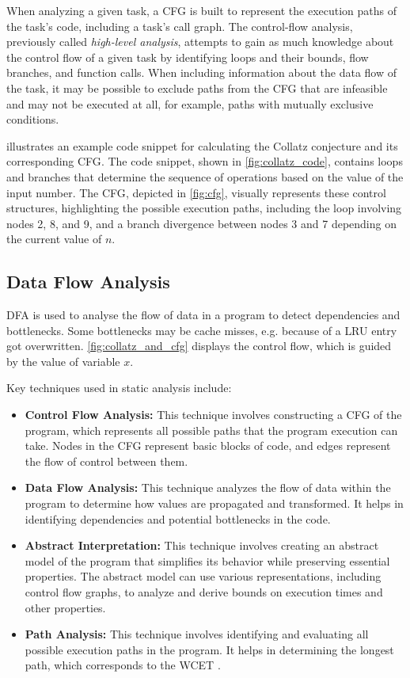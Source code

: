 When analyzing a given task, a \ac{CFG} is built to represent the execution paths of the task's code, including a task's call graph. The control-flow analysis, previously called \textit{high-level analysis}, attempts to gain as much knowledge about the control flow of a given task by identifying loops and their bounds, flow branches, and function calls. When including information about the data flow of the task, it may be possible to exclude paths from the \ac{CFG} that are infeasible and may not be executed at all, for example, paths with mutually exclusive conditions. 

 illustrates an example code snippet for calculating the Collatz conjecture and its corresponding \ac{CFG}. The code snippet, shown in \cref{fig:collatz_code}, contains loops and branches that determine the sequence of operations based on the value of the input number. The \ac{CFG}, depicted in \cref{fig:cfg}, visually represents these control structures, highlighting the possible execution paths, including the loop involving nodes 2, 8, and 9, and a branch divergence between nodes 3 and 7 depending on the current value of $n$.


\subsection{Data Flow Analysis}\label{sec:dfa}
\ac{DFA} is used to analyse the flow of data in a program to detect dependencies and bottlenecks.
Some bottlenecks may be cache misses, e.g. because of a \ac{LRU} entry got overwritten.
\ref{fig:collatz_and_cfg} displays the control flow, which is guided by the value of variable $x$.

Key techniques used in static analysis include:
\begin{itemize}
	\item \textbf{Control Flow Analysis:} This technique involves constructing a \ac{CFG} of the program, which represents all possible paths that the program execution can take. Nodes in the CFG represent basic blocks of code, and edges represent the flow of control between them.
	\item \textbf{Data Flow Analysis:} This technique analyzes the flow of data within the program to determine how values are propagated and transformed. It helps in identifying dependencies and potential bottlenecks in the code.
	\item \textbf{Abstract Interpretation:} This technique involves creating an abstract model of the program that simplifies its behavior while preserving essential properties. The abstract model can use various representations, including control flow graphs, to analyze and derive bounds on execution times and other properties.
	\item \textbf{Path Analysis:} This technique involves identifying and evaluating all possible execution paths in the program. It helps in determining the longest path, which corresponds to the WCET
	.
\end{itemize}

